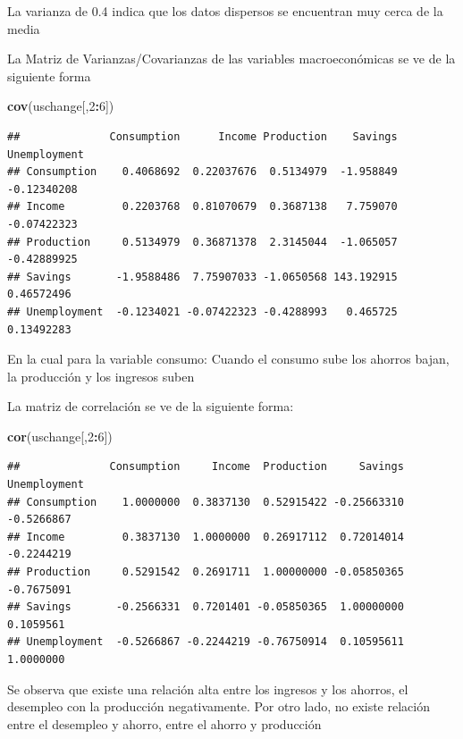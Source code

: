 \documentclass[
]{article}
\newenvironment{Shaded}{\begin{snugshade}}{\end{snugshade}}
\newcommand{\DecValTok}[1]{\textcolor[rgb]{0.00,0.00,0.81}{#1}}
\newcommand{\FunctionTok}[1]{\textcolor[rgb]{0.13,0.29,0.53}{\textbf{#1}}}
\newcommand{\NormalTok}[1]{#1}
\newcommand{\SpecialCharTok}[1]{\textcolor[rgb]{0.81,0.36,0.00}{\textbf{#1}}}
\begin{document}

La varianza de 0.4 indica que los datos dispersos se encuentran muy
cerca de la media

La Matriz de Varianzas/Covarianzas de las variables macroeconómicas se
ve de la siguiente forma

\begin{Shaded}
\begin{Highlighting}[]
\FunctionTok{cov}\NormalTok{(uschange[,}\DecValTok{2}\SpecialCharTok{:}\DecValTok{6}\NormalTok{])}
\end{Highlighting}
\end{Shaded}

\begin{verbatim}
##              Consumption      Income Production    Savings Unemployment
## Consumption    0.4068692  0.22037676  0.5134979  -1.958849  -0.12340208
## Income         0.2203768  0.81070679  0.3687138   7.759070  -0.07422323
## Production     0.5134979  0.36871378  2.3145044  -1.065057  -0.42889925
## Savings       -1.9588486  7.75907033 -1.0650568 143.192915   0.46572496
## Unemployment  -0.1234021 -0.07422323 -0.4288993   0.465725   0.13492283
\end{verbatim}

En la cual para la variable consumo: Cuando el consumo sube los ahorros
bajan, la producción y los ingresos suben

La matriz de correlación se ve de la siguiente forma:

\begin{Shaded}
\begin{Highlighting}[]
\FunctionTok{cor}\NormalTok{(uschange[,}\DecValTok{2}\SpecialCharTok{:}\DecValTok{6}\NormalTok{])}
\end{Highlighting}
\end{Shaded}

\begin{verbatim}
##              Consumption     Income  Production     Savings Unemployment
## Consumption    1.0000000  0.3837130  0.52915422 -0.25663310   -0.5266867
## Income         0.3837130  1.0000000  0.26917112  0.72014014   -0.2244219
## Production     0.5291542  0.2691711  1.00000000 -0.05850365   -0.7675091
## Savings       -0.2566331  0.7201401 -0.05850365  1.00000000    0.1059561
## Unemployment  -0.5266867 -0.2244219 -0.76750914  0.10595611    1.0000000
\end{verbatim}

Se observa que existe una relación alta entre los ingresos y los
ahorros, el desempleo con la producción negativamente. Por otro lado, no
existe relación entre el desempleo y ahorro, entre el ahorro y
producción
\end{document}
